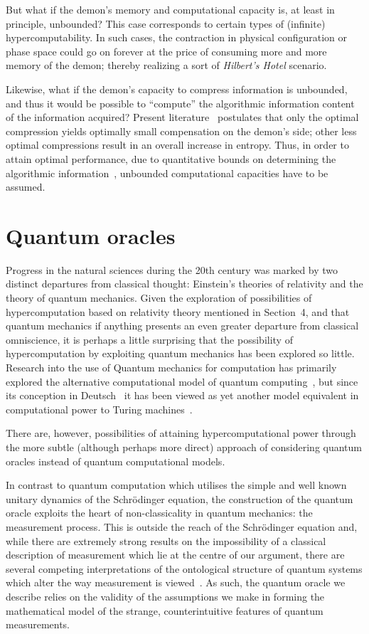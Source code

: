 \documentclass{comjnl}
\begin{document}
But what if the demon's memory and computational capacity is, at least in principle, unbounded?
This case corresponds to certain types of (infinite) hypercomputability.
In such cases, the contraction in physical configuration or phase space
could go on forever at the price of consuming more and more memory of the demon;
thereby realizing a sort of {\em Hilbert's Hotel} scenario.

Likewise, what if the demon's capacity to compress information is unbounded, and thus it would be possible to ``compute'' the algorithmic
information content of the information acquired?
Present literature~\cite{zurek,li-vitanyi-2008,681318} postulates that only the optimal compression
yields optimally small compensation on the demon's side;
other less optimal compressions result in an overall increase in entropy.
Thus, in order to attain optimal performance,  due to
quantitative bounds on determining the algorithmic information~\cite[Section~8.2]{calude:02},
unbounded computational capacities have to be assumed.


\section{Quantum oracles}


Progress in the natural sciences during the 20th century was marked by two distinct departures from classical thought:
Einstein's theories of relativity and the theory of quantum mechanics.
Given the exploration of possibilities of hypercomputation based on relativity theory mentioned in Section~4, and that quantum mechanics if anything presents an even greater departure from classical omniscience, it is perhaps a little surprising that the possibility of hypercomputation by exploiting quantum mechanics has been explored so little.
Research into the use of Quantum mechanics for computation has primarily explored the alternative computational model of quantum computing~\cite{Gruska}, but since its conception in Deutsch~\cite{deutsch} it has been viewed as yet another model equivalent in computational power to Turing machines~\cite{be-va}.

There are, however, possibilities of attaining hypercomputational power through the more subtle (although perhaps more direct) approach of considering quantum oracles instead of quantum computational models.

In contrast to quantum computation which utilises the simple and well known unitary dynamics of the Schr\"odinger equation, the construction of the quantum oracle exploits the heart of non-classicality in quantum mechanics: the measurement process.
This is outside the reach of the Schr\"odinger equation and, while there are extremely strong results on the impossibility of a classical description of measurement which lie at the centre of our argument, there are several competing interpretations of the ontological structure of quantum systems which alter the way measurement is viewed~\cite{wheeler-Zurek:83}.
As such, the quantum oracle we describe relies on the validity of the assumptions we make in forming the mathematical model of the strange, counterintuitive features of quantum measurements.
\end{document}

